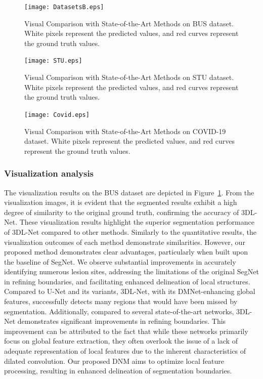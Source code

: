 \documentclass[review]{elsarticle}
\begin{document}
	\begin{figure}[!t]
		\centering
		\begin{adjustwidth}{-4.4cm}{}
			\texttt{[image: DatasetsB.eps]}
		\end{adjustwidth}
		\caption{Visual Comparison with State-of-the-Art Methods on BUS dataset. White pixels represent the predicted values, and red curves represent the ground truth values.}
		\label{fig:Visual_BUS}
	\end{figure}
	\begin{figure}[!t]
		\centering
		\begin{adjustwidth}{-4.4cm}{}
			\texttt{[image: STU.eps]}
		\end{adjustwidth}
		\caption{Visual Comparison with State-of-the-Art Methods on STU dataset. White pixels represent the predicted values, and red curves represent the ground truth values.}
		\label{fig:Visual_STU}
	\end{figure}
	\begin{figure}[!t]
		\centering
		\begin{adjustwidth}{-4.4cm}{}
			\texttt{[image: Covid.eps]}
		\end{adjustwidth}
		\caption{Visual Comparison with State-of-the-Art Methods on COVID-19 dataset. White pixels represent the predicted values, and red curves represent the ground truth values.}
		\label{fig:Visual_COVID}
	\end{figure}
	
	\subsubsection{Visualization analysis}
	The visualization results on the BUS dataset are depicted in Figure~\ref{fig:Visual_BUS}. From the visualization images, it is evident that the segmented results exhibit a high degree of similarity to the original ground truth, confirming the accuracy of 3DL-Net. These visualization results highlight the superior segmentation performance of 3DL-Net compared to other methods. Similarly to the quantitative results, the visualization outcomes of each method demonstrate similarities. However, our proposed method demonstrates clear advantages, particularly when built upon the baseline of SegNet. We observe substantial improvements in accurately identifying numerous lesion sites, addressing the limitations of the original SegNet in refining boundaries, and facilitating enhanced delineation of local structures. Compared to U-Net and its variants, 3DL-Net, with its DMNet-enhancing global features, successfully detects many regions that would have been missed by segmentation. Additionally, compared to several state-of-the-art networks, 3DL-Net demonstrates significant improvements in refining boundaries. This improvement can be attributed to the fact that while these networks primarily focus on global feature extraction, they often overlook the issue of a lack of adequate representation of local features due to the inherent characteristics of dilated convolution. Our proposed DNM aims to optimize local feature processing, resulting in enhanced delineation of segmentation boundaries.
	
\end{document}
